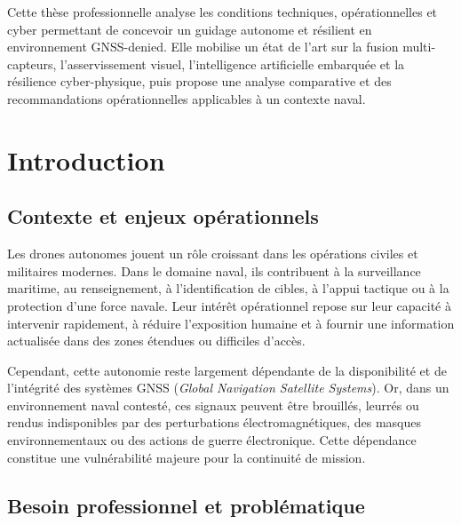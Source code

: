 \documentclass[12pt, a4paper, twoside, openright]{report}
\begin{document}
Cette thèse professionnelle analyse les conditions techniques, opérationnelles et cyber permettant de concevoir un guidage autonome et résilient en environnement GNSS-denied. Elle mobilise un état de l'art sur la fusion multi-capteurs, l'asservissement visuel, l'intelligence artificielle embarquée et la résilience cyber-physique, puis propose une analyse comparative et des recommandations opérationnelles applicables à un contexte naval.

\cleardoublepage

\tableofcontents
\cleardoublepage

\listoffigures
\cleardoublepage

\listoftables
\cleardoublepage


\chapter{Introduction}

\section{Contexte et enjeux opérationnels}

Les drones autonomes jouent un rôle croissant dans les opérations civiles et militaires modernes. Dans le domaine naval, ils contribuent à la surveillance maritime, au renseignement, à l'identification de cibles, à l'appui tactique ou à la protection d'une force navale. Leur intérêt opérationnel repose sur leur capacité à intervenir rapidement, à réduire l'exposition humaine et à fournir une information actualisée dans des zones étendues ou difficiles d'accès.

Cependant, cette autonomie reste largement dépendante de la disponibilité et de l'intégrité des systèmes GNSS (\textit{Global Navigation Satellite Systems}). Or, dans un environnement naval contesté, ces signaux peuvent être brouillés, leurrés ou rendus indisponibles par des perturbations électromagnétiques, des masques environnementaux ou des actions de guerre électronique. Cette dépendance constitue une vulnérabilité majeure pour la continuité de mission.

\section{Besoin professionnel et problématique}
\end{document}
